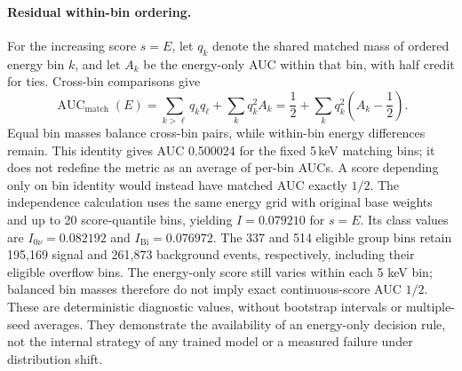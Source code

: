 \paragraph{Residual within-bin ordering.}
For the increasing score $s=E$, let $q_k$ denote the shared matched mass
of ordered energy bin $k$, and let $A_k$ be the energy-only AUC within that
bin, with half credit for ties. Cross-bin comparisons give
\begin{equation}
 \operatorname{AUC}_{\mathrm{match}}(E)
 =\sum_{k>\ell}q_kq_\ell+\sum_kq_k^2A_k
 =\frac12+\sum_kq_k^2\left(A_k-\frac12\right).
 \label{eq:energy-only-decomposition}
\end{equation}
Equal bin masses balance cross-bin pairs, while within-bin energy
differences remain. This identity gives AUC 0.500024 for the fixed
5\,keV matching bins;
it does not redefine the metric as an average of per-bin AUCs. A score
depending only on bin identity would instead have matched AUC exactly
$1/2$. The independence calculation uses the same energy grid with original base
weights and up to 20 score-quantile bins, yielding $I=0.079210$ for $s=E$.
Its class values are $I_{0\nu}=0.082192$ and $I_{\mathrm{Bi}}=0.076972$.
The 337 and 514 eligible group bins retain 195,169 signal and 261,873
background events, respectively, including their eligible overflow bins.
The energy-only score still varies within each 5 keV bin; balanced bin
masses therefore do not imply exact continuous-score AUC $1/2$.
These are deterministic diagnostic values, without
bootstrap intervals or multiple-seed averages. They demonstrate the
availability of an energy-only decision rule, not the internal strategy
of any trained model or a measured failure under distribution shift.
